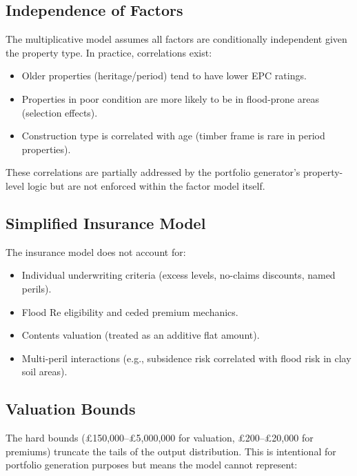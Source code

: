 \documentclass[11pt,a4paper]{article}
\begin{document}
\subsection{Independence of Factors}

The multiplicative model assumes all factors are conditionally independent
given the property type. In practice, correlations exist:

\begin{itemize}
    \item Older properties (heritage/period) tend to have lower EPC ratings.
    \item Properties in poor condition are more likely to be in flood-prone
          areas (selection effects).
    \item Construction type is correlated with age (timber frame is rare
          in period properties).
\end{itemize}

\noindent These correlations are partially addressed by the portfolio
generator's property-level logic but are not enforced within the factor
model itself.

\subsection{Simplified Insurance Model}

The insurance model does not account for:

\begin{itemize}
    \item Individual underwriting criteria (excess levels, no-claims
          discounts, named perils).
    \item Flood Re eligibility and ceded premium mechanics.
    \item Contents valuation (treated as an additive flat amount).
    \item Multi-peril interactions (e.g., subsidence risk correlated with
          flood risk in clay soil areas).
\end{itemize}

\subsection{Valuation Bounds}

The hard bounds (\pounds150,000--\pounds5,000,000 for valuation,
\pounds200--\pounds20,000 for premiums) truncate the tails of the
output distribution. This is intentional for portfolio generation purposes
but means the model cannot represent:
\end{document}
